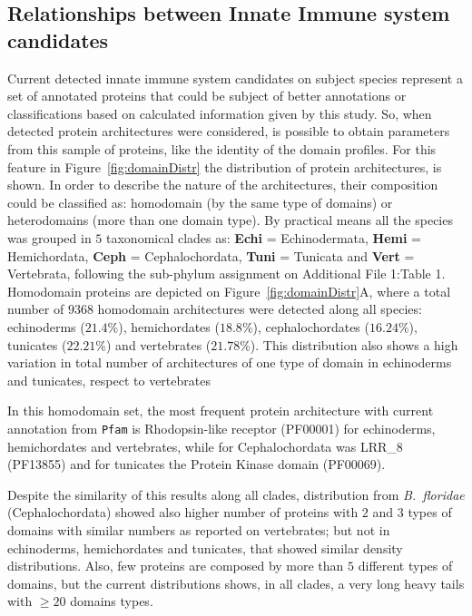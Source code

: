 \documentclass[11pt]{article}
\newcommand{\TODO}[1]{\begingroup\color{red}#1\endgroup}
\begin{document}
\subsection*{Relationships between Innate Immune system candidates}\label{Orthology}

Current detected innate immune system candidates on subject species represent
a set of annotated proteins that could be subject of better annotations or
classifications based on calculated information given by this study. So, 
when detected protein architectures were considered, is possible to obtain 
parameters from this sample of proteins, like the identity of the domain profiles. 
For this feature in Figure~\ref{fig:domainDistr} the distribution of protein architectures, 
is shown. In order to describe the nature of the architectures, their composition could be
classified as: homodomain (by the same type of domains) or  heterodomains (more than one 
domain type). By practical means all the species was grouped in $5$ taxonomical clades as:
\textbf{Echi} = Echinodermata, \textbf{Hemi} = Hemichordata, \textbf{Ceph} = Cephalochordata, 
\textbf{Tuni} = Tunicata and \textbf{Vert} = Vertebrata, following the sub-phylum 
assignment on Additional File 1:Table 1. Homodomain proteins are depicted on 
Figure~\ref{fig:domainDistr}A, where a total number of $9368$ homodomain architectures 
were detected along all species: echinoderms ($21.4$\%), hemichordates ($18.8$\%), 
cephalochordates ($16.24$\%), tunicates ($22.21$\%) and vertebrates ($21.78$\%). 
This distribution also shows a high variation in total number of architectures of 
one type of domain in echinoderms and tunicates, respect to vertebrates 

In this homodomain set, the most frequent protein architecture with 
current annotation from \texttt{Pfam} is Rhodopsin-like receptor 
(PF00001) for echinoderms, hemichordates and vertebrates, while for 
Cephalochordata was LRR\_8 (PF13855) and for tunicates the Protein 
Kinase domain (PF00069). 

 


Despite the similarity of this results along all clades, distribution 
from \textsl{B.\ floridae} (Cephalochordata) showed also higher number of 
proteins with $2$ and $3$ types of domains with similar numbers as reported 
on vertebrates; but not in echinoderms, hemichordates and tunicates, that 
showed similar density distributions. Also, few proteins are composed by more 
than $5$ different types of domains, but the current distributions shows, in 
all clades, a very long heavy tails with \TODO{$\ge 20$ domains types}.
\end{document}

